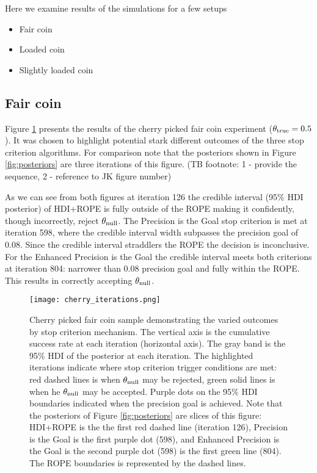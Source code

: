 
Here we examine results of the simulations for a few setups

\begin{itemize}
  \item Fair coin
  \item Loaded coin
  \item Slightly loaded coin
\end{itemize}

\subsection{Fair coin}\label{sec:fair_coin}

Figure \ref{fig:iterations} presents the results of the cherry picked fair coin
experiment ($\theta_{\rm true}=0.5$). It was chosen to highlight potential stark
different outcomes of the three stop criterion algorithms. For comparison note that the
posteriors shown in Figure \ref{fig:posteriors} are three iterations of this figure.
(TB footnote: 1 - provide the sequence, 2 - reference to JK figure number)

As we can see from both figures at iteration 126 the credible interval
(95\% HDI posterior) of HDI+ROPE is fully
outside of the ROPE making it confidently, though incorrectly,
reject $\theta_{\rm null}$.
The Precision is the Goal stop criterion is met at iteration 598, where the credible
interval width
subpasses the precision goal of 0.08. Since the credible interval straddlers the ROPE
the decision is inconclusive.
For the Enhanced Precision is the Goal the credible interval
meets both criterions at iteration 804: narrower than 0.08 precision goal and fully
within the ROPE.
This results in correctly accepting $\theta_{\rm null}$.


\begin{figure}[h!]
  \centering
  \texttt{[image: cherry\_iterations.png]}
  \caption{Cherry picked fair coin sample demonstrating the varied outcomes by
  stop criterion mechanism. The vertical axis is the cumulative success rate
  at each iteration (horizontal axis).
  The gray band is the 95\% HDI of the posterior at each iteration.
  The highlighted iterations indicate where stop criterion trigger conditions are met:
  red dashed lines is when  $\theta_{\rm null}$ may be rejected, green solid lines
  is when he $\theta_{\rm null}$ may be accepted. Purple dots on the 95\% HDI boundaries
  indicated when the precision goal is achieved. Note that the posteriors of
  Figure \ref{fig:posteriors} are slices of this figure: HDI+ROPE is the the first red
  dashed line (iteration 126),
  Precision is the Goal is the first purple dot (598), and
  Enhanced Precision is the Goal is the second purple dot (598) is the
  first green line (804). The ROPE boundaries is represented by the dashed lines.
  }
  \label{fig:iterations}
\end{figure}

